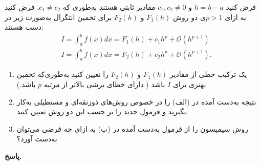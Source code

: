 فرض کنید
\(h = b - a\)
و
\(c_1, c_2 \ne 0\)
مقادیر ثابتی هستند به‌طوری که 
\(c_1 \ne c_2\).
فرض کنید به ازای 
\(p>1\)ی دو روش 
\(F_1(h)\)
و
\(F_2(h)\)
برای تخمین انتگرال به‌صورت زیر در دست هستند:
\begin{align*}
		& I = \int_{a}^{b} f(x)dx = F_1(h) + c_1h^p + \mathcal{O}(h^{p+1})\\
		& I = \int_{a}^{b} f(x)dx = F_2(h) + c_2h^p + \mathcal{O}(h^{p+1}).
\end{align*}
\begin{enumerate}
	\item[الف)] یک ترکیب خطی از مقادیر 
	\(F_1(h)\)
	و
	\(F_2(h)\)
	را تعیین کنید به‌طوری‌که تخمین بهتری برای 
\(I\)
باشد ( دارای خطای برشی بالاتر از مرتبه 
\(p\)
باشد.)
	\item[ب)] 
نتیجه به‌دست آمده در (الف) را در خصوص روش‌های ذوزنقه‌ای و مستطیلی به‌کار بگیرید و فرمول جدید را بر حسب این دو روش تعیین کنید.
\item[پ)] 
روش سیمپسون را از فرمول به‌دست آمده در (ب) به ازای چه فرضی می‌توان به‌دست آورد؟
\end{enumerate}

\vspace*{-.3cm}

\begin{answer}

	\textbf{پاسخ.}
	
\end{answer}
